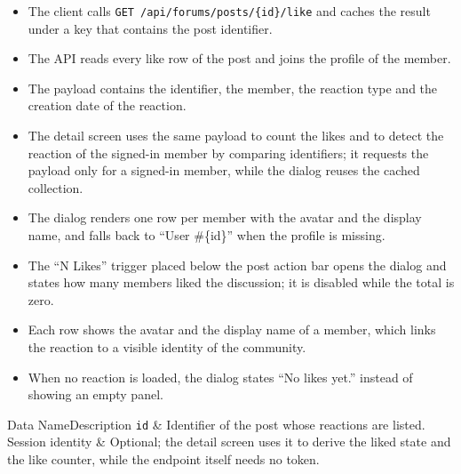 \begin{itemize}[leftmargin=1.6em,topsep=3pt,itemsep=2pt,parsep=0pt,label=$\bullet$]
      \item The client calls \texttt{GET /api/forums/posts/\{id\}/like} and caches the
            result under a key that contains the post identifier.
      \item The API reads every like row of the post and joins the profile of the member.
      \item The payload contains the identifier, the member, the reaction type and the
            creation date of the reaction.
      \item The detail screen uses the same payload to count the likes and to detect the
            reaction of the signed-in member by comparing identifiers; it requests the
            payload only for a signed-in member, while the dialog reuses the cached
            collection.
      \item The dialog renders one row per member with the avatar and the display name, and
            falls back to ``User \#\{id\}'' when the profile is missing.
\end{itemize}

\begin{itemize}[leftmargin=1.6em,topsep=3pt,itemsep=2pt,parsep=0pt,label=$\bullet$]
      \item The ``N Likes'' trigger placed below the post action bar opens the dialog and
            states how many members liked the discussion; it is disabled while the total is
            zero.
      \item Each row shows the avatar and the display name of a member, which links the
            reaction to a visible identity of the community.
      \item When no reaction is loaded, the dialog states ``No likes yet.'' instead of
            showing an empty panel.
\end{itemize}


\begin{specdatatable}{Data Name}{Description}
      \texttt{id} & Identifier of the post whose reactions are listed.\\ \hline
      Session identity & Optional; the detail screen uses it to derive the liked state and the like
      counter, while the endpoint itself needs no token.\\ \hline
\end{specdatatable}

